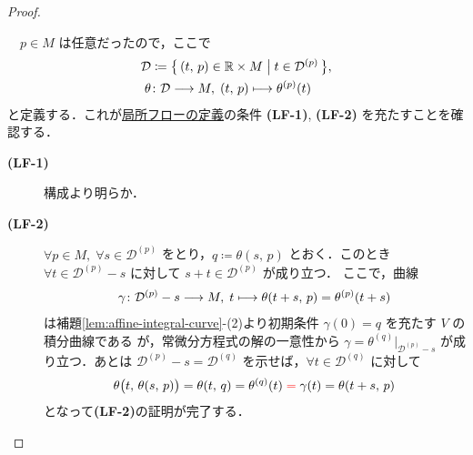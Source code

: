 \documentclass[TQFT_main]{subfiles}
\begin{document}
\begin{proof}
\begin{description}
        　$p \in M$ は任意だったので，ここで
        \begin{align}
            \mathcal{D} &\coloneqq \bigl\{\, (t,\, p) \in \mathbb{R} \times M \bigm| t \in \mathcal{D}^{(p)} \,\bigr\}, \\
            \theta &\colon \mathcal{D} \longrightarrow M,\; (t,\, p) \longmapsto \theta^{(p)}(t)
        \end{align}
        と定義する．これが\hyperref[def:local-flow]{局所フローの定義}の条件 \textbf{\textsf{(LF-1)}},  \textbf{\textsf{(LF-2)}} を充たすことを確認する．
        \begin{description}
            \item[\textbf{(LF-1)}] 構成より明らか．
            \item[\textbf{(LF-2)}] $\forall p \in M,\; \forall s \in \mathcal{D}^{(p)}$ をとり，$q \coloneqq \theta(s,\, p)$ とおく．このとき $\forall t \in \mathcal{D}^{(p)} - s$ に対して $s+t \in \mathcal{D}^{(p)}$ が成り立つ．
            ここで，\cinfty 曲線
            \begin{align}
                \gamma \colon \mathcal{D}^{(p)} - s \longrightarrow M,\; t \longmapsto \theta(t+s,\, p) = \theta^{(p)}(t+s)
            \end{align}
            は補題\ref{lem:affine-integral-curve}-(2)より初期条件 $\gamma(0) = q$ を充たす $V$ の積分曲線である
            が，常微分方程式の解の一意性から $\gamma = \theta^{(q)}|_{\mathcal{D}^{(p)} - s}$ が成り立つ．あとは $\mathcal{D}^{(p)} - s = \mathcal{D}^{(q)}$ を示せば，$\forall t \in \mathcal{D}^{(q)}$ に対して
            \begin{align}
                \theta \bigl( t,\,\theta(s,\, p) \bigr) = \theta (t,\, q) = \theta^{(q)}(t) \;\textcolor{red}{=}\; \gamma(t) = \theta(t+s,\, p)
            \end{align}
            となって\textbf{\textsf{(LF-2)}}の証明が完了する．


\end{description}
\end{description}
\end{proof}
\end{document}
